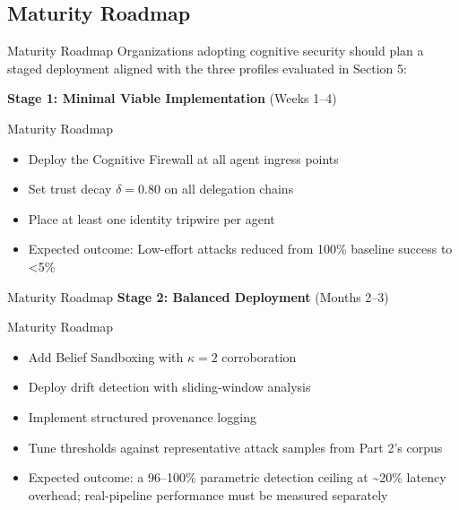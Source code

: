 \documentclass[
  ignorenonframetext,
]{beamer}
\providecommand{\tightlist}{%
  \setlength{\itemsep}{0pt}\setlength{\parskip}{0pt}}
\begin{document}
\subsection{Maturity Roadmap}\label{maturity-roadmap}

\begin{frame}[allowframebreaks]{Maturity Roadmap}
Organizations adopting cognitive security should plan a staged
deployment aligned with the three profiles evaluated in Section 5:

\textbf{Stage 1: Minimal Viable Implementation} (Weeks 1--4)

\end{frame}

\begin{frame}[allowframebreaks]{Maturity Roadmap}
\begin{itemize}
\tightlist
\item
  Deploy the Cognitive Firewall at all agent ingress points
\item
  Set trust decay \(\delta = 0.80\) on all delegation chains
\item
  Place at least one identity tripwire per agent
\item
  Expected outcome: Low-effort attacks reduced from 100\% baseline
  success to \textless5\%
\end{itemize}

\end{frame}

\begin{frame}[allowframebreaks]{Maturity Roadmap}
\textbf{Stage 2: Balanced Deployment} (Months 2--3)

\end{frame}

\begin{frame}[allowframebreaks]{Maturity Roadmap}
\begin{itemize}
\tightlist
\item
  Add Belief Sandboxing with \(\kappa = 2\) corroboration
\item
  Deploy drift detection with sliding-window analysis
\item
  Implement structured provenance logging
\item
  Tune thresholds against representative attack samples from Part 2's
  corpus
\item
  Expected outcome: a 96--100\% parametric detection ceiling at
  \textasciitilde20\% latency overhead; real-pipeline performance must
  be measured separately
\end{itemize}

\end{frame}
\end{document}
